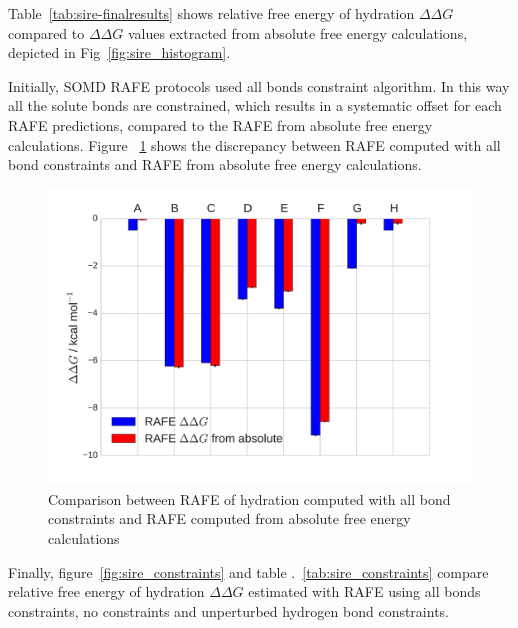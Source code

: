 \documentclass[journal=jctcce,manuscript=suppinfo]{achemso}
\begin{document}
Table~\ref{tab:sire-finalresults} shows relative free energy of hydration 
$\Delta\Delta G$ compared to $\Delta\Delta G$ values extracted from absolute 
free energy calculations, depicted in Fig~\ref{fig:sire_histogram}.

Initially, SOMD RAFE protocols used all bonds constraint algorithm. In this way all the solute bonds are constrained, which results in a
systematic offset for each RAFE predictions, compared to the RAFE from absolute free energy calculations.
Figure ~\ref{fig:sire_allbonds} shows the discrepancy between RAFE computed with all bond constraints and RAFE from absolute free energy calculations.


\begin{figure}[ht]
  \includegraphics[width=\textwidth]{figures/SI_sire_allbonds_relabs.pdf}
  \caption{Comparison between RAFE of hydration computed with all bond constraints and RAFE computed from absolute free energy calculations}
  \label{fig:sire_allbonds}
\end{figure}

Finally, figure~\ref{fig:sire_constraints} and table .~\ref{tab:sire_constraints} compare relative free energy of hydration $\Delta \Delta G$ estimated with RAFE using all bonds constraints, no constraints and unperturbed hydrogen bond constraints.
\end{document}
